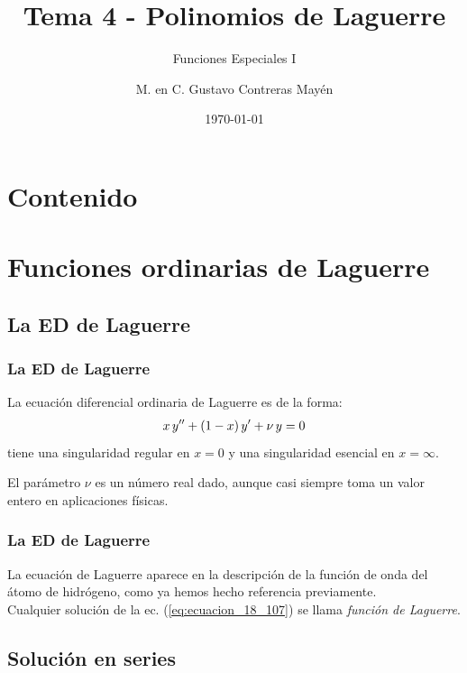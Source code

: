 \documentclass[12pt]{beamer}
\date{\today}
\title{\large{Tema 4 - Polinomios de Laguerre}}
\subtitle{Funciones Especiales I}
\author{M. en C. Gustavo Contreras Mayén}
\begin{document}
\maketitle
\fontsize{14}{14}\selectfont
{}

\section*{Contenido}

\section{Funciones ordinarias de Laguerre}\label{sec:seccion_01}
\subsection{La ED de Laguerre}

\begin{frame}
\frametitle{La ED de Laguerre}
La ecuación diferencial ordinaria de Laguerre es de la forma:
\pause
\begin{align}
x \, {y}^{\prime \prime} + (1 - x) \, {y}^{\prime} + \nu \, y = 0
\label{eq:ecuacion_18_107}
\end{align}
tiene una singularidad regular en $x = 0$ y una singularidad esencial en $x = \infty$. 

El parámetro $\nu$ es un número real dado, aunque casi siempre toma un valor entero en aplicaciones físicas.
\end{frame}
\begin{frame}
\frametitle{La ED de Laguerre}
La ecuación de Laguerre aparece en la descripción de la función de onda del átomo de hidrógeno, como ya hemos hecho referencia previamente.
\\
\bigskip
\pause
Cualquier solución de la ec. (\ref{eq:ecuacion_18_107}) se llama \emph{función de Laguerre}.
\end{frame}

\subsection{Solución en series}
\end{document}
